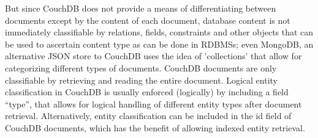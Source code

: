 But since CouchDB does not provide a means of differentiating between documents except by the content of each document, database content is not immediately classifiable by relations, fields, constraints and other objects that can be used to ascertain content type as can be done in RDBMSs; even MongoDB, an alternative JSON store to CouchDB uses the idea of 'collections' that allow for categorizing different types of documents. CouchDB documents are only classifiable by retrieving and reading the entire document. Logical entity classification in CouchDB is usually enforced (logically) by including a field ``type'', that allows for logical handling of different entity types after document retrieval. Alternatively, entity classification can be included in the id field of CouchDB documents, which has the benefit of allowing indexed entity retrieval.